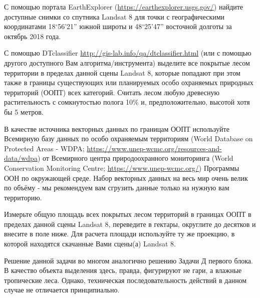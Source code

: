 
С помощью портала EarthExplorer (\url{https://earthexplorer.usgs.gov/}) найдите доступные снимки со спутника 
Landsat 8 для точки с географическими координатами 18$^{\circ}$56'21'' южной широты и 48$^{\circ}$25'47'' восточной долготы за октябрь 2018 года.

С помощью DTclassifier \url{http://gis-lab.info/qa/dtclassifier.html} (или с помощью другого доступного Вам алгоритма/инструмента) выделите все покрытые лесом территории в пределах данной сцены Landsat 8, которые попадают при этом также в границы существующих или планируемых особо охраняемых природных территорий (ООПТ) всех категорий. Считать лесом любую древесную растительность с сомкнутостью полога 10\% и, предположительно, высотой хотя бы 5 метров.

В качестве источника векторных данных по границам ООПТ используйте Всемирную базу 
данных по особо охраняемым территориям (World Database on Protected Areas - WDPA; \url{https://www.unep-wcmc.org/resources-and-data/wdpa}) от 
Всемирного центра природоохранного мониторинга (World Conservation Monitoring Centre; \url{https://www.unep-wcmc.org/}) Программы ООН по окружающей среде. Набор векторных данных на весь мир очень велик по объёму - мы рекомендуем вам сгрузить данные только на нужную вам территорию. 

Измерьте общую площадь всех покрытых лесом территорий в границах ООПТ в пределах данной сцены Landsat 8, переведите в гектары, округлите до десятков и внесите в поле ниже. Для расчета площади используйте ту же проекцию, в которой находятся скачанные Вами сцены(а) Landsat 8.

\explanationSection

Решение данной задачи во многом аналогично решению Задачи Д первого блока. В качество объекта выделения здесь, правда, фигурируют не гари, а влажные тропические леса. Однако, техническая последовательность действий в данном случае не отличается принципиально.


